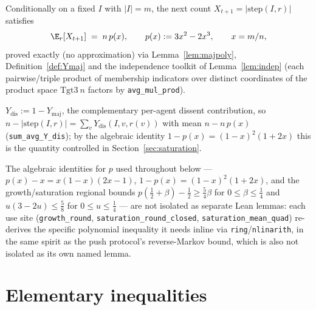 \begin{lemma}\label{lem:drift}
  \leanok
  Conditionally on a fixed $I$ with $|I|=m$, the next count
  $X_{t+1} = |\mathrm{step}(I,r)|$ satisfies
  \[
    \E_r[X_{t+1}] \;=\; n\,p(x), \qquad p(x) := 3x^2-2x^3, \qquad x = m/n,
  \]
  proved exactly (no approximation) via Lemma~\ref{lem:majpoly},
  Definition~\ref{def:Ymaj} and the independence toolkit of
  Lemma~\ref{lem:indep} (each pairwise/triple product of membership
  indicators over distinct coordinates of the product space
  $\mathrm{Tgt3}\ n$ factors by \texttt{avg\_mul\_prod}).
\end{lemma}

\begin{definition}\label{def:Ydis}
  \leanok
  $Y_{\mathrm{dis}} := 1 - Y_{\mathrm{maj}}$, the complementary per-agent
  dissent contribution, so $n - |\mathrm{step}(I,r)| = \sum_v
  Y_{\mathrm{dis}}(I,v,r(v))$ with mean $n - n\,p(x)$
  (\texttt{sum\_avg\_Y\_dis}); by the algebraic identity
  $1-p(x) = (1-x)^2(1+2x)$ this is the quantity controlled in
  Section~\ref{sec:saturation}.
\end{definition}

\begin{remark}
  The algebraic identities for $p$ used throughout below --- $p(x)-x =
  x(1-x)(2x-1)$, $1-p(x) = (1-x)^2(1+2x)$, and the growth/saturation
  regional bounds $p(\tfrac12+\beta)-\tfrac12 \ge \tfrac54\beta$ for
  $0\le\beta\le\tfrac14$ and $u(3-2u)\le\tfrac58$ for $0\le u\le\tfrac14$ ---
  are not isolated as separate Lean lemmas: each use site
  (\texttt{growth\_round}, \texttt{saturation\_round\_closed},
  \texttt{saturation\_mean\_quad}) re-derives the specific polynomial
  inequality it needs inline via \texttt{ring}/\texttt{nlinarith}, in the
  same spirit as the push protocol's reverse-Markov bound, which is also
  not isolated as its own named lemma.
\end{remark}

\section{Elementary inequalities}\label{sec:ineq}

